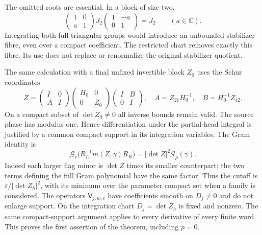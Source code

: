 The omitted roots are essential.  In a block of size two,
\[
 \begin{pmatrix}1&0\\a&1\end{pmatrix}
 J_2
 \begin{pmatrix}1&-a\\0&1\end{pmatrix}=J_2
 \qquad(a\in\mathbb C).
\]
Integrating both full triangular groups would introduce an
unbounded stabilizer fibre, even over a compact coefficient.
The restricted chart removes exactly this fibre.  Its use does
not replace or renormalize the original stabilizer quotient.

The same calculation with a final unfixed invertible block $Z_0$
uses the Schur coordinates
\[
 Z=\begin{pmatrix}I&0\\ A&I\end{pmatrix}
       \begin{pmatrix}H_0&0\\0&Z_0\end{pmatrix}
       \begin{pmatrix}I&B\\0&I\end{pmatrix},
 \quad A=Z_{21}H_0^{-1},\quad B=H_0^{-1}Z_{12}.
\]
On a compact subset of $\det Z_0\ne0$ all inverse bounds remain
valid.  The source phase has modulus one.  Hence differentiation
under the partial-head integral is justified by a common compact
support in its integration variables.  The Gram identity is
\begin{equation}\label{partial-head-gram}
 \mathcal G_r\bigl(R_L^{-1}m(Z,\gamma)R_R\bigr)
                        =|\det Z|^2\mathcal G_\rho(\gamma).
\end{equation}
Indeed each larger flag minor is $\det Z$ times its smaller
counterpart; the two terms defining the full Gram polynomial
have the same factor.  Thus the cutoff is
$\varepsilon/|\det Z_h|^2$, with its minimum over the parameter
compact set when a family is considered.
The operators $\mathsf V_{j,w,e}$ have coefficients smooth on
$D_j\ne0$ and do not enlarge support.  On the integration chart
$D_j=\det Z_h$ is fixed and nonzero.  The same compact-support
argument applies to every derivative of every finite word.
This proves the first assertion of the theorem, including $p=0$.

